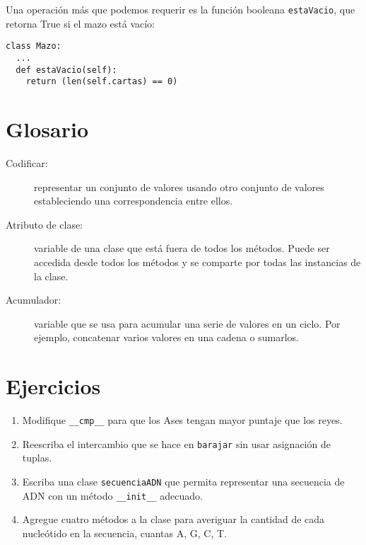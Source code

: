  

Una operación más que podemos requerir es la función booleana \texttt{estaVacio},
que retorna True si el mazo está vacío:

\begin{verbatim}
class Mazo:
  ...
  def estaVacio(self):
    return (len(self.cartas) == 0)
\end{verbatim}

\section{Glosario}
\begin{description}
\item [{Codificar:}] representar un conjunto de valores usando otro conjunto
de valores estableciendo una correspondencia entre ellos.
\item [{Atributo de clase:}] variable de una clase que está fuera de todos
los métodos. Puede ser accedida desde todos los métodos y se comparte
por todas las instancias de la clase.
\item [{Acumulador:}] variable que se usa para acumular una serie de valores
en un ciclo. Por ejemplo, concatenar varios valores en una cadena
o sumarlos.

  
\end{description}

\section{Ejercicios}
\begin{enumerate}
\item Modifique \texttt{\_\_cmp\_\_} para que los Ases tengan mayor puntaje
que los reyes.
\item Reescriba el intercambio que se hace en \texttt{barajar} sin usar
asignación de tuplas.
\item Escriba una clase \texttt{secuenciaADN} que permita representar una
secuencia de ADN con un método \texttt{\_\_init\_\_} adecuado.
\item Agregue cuatro métodos a la clase para averiguar la cantidad de cada
nucleótido en la secuencia, cuantas A, G, C, T.
\end{enumerate}

